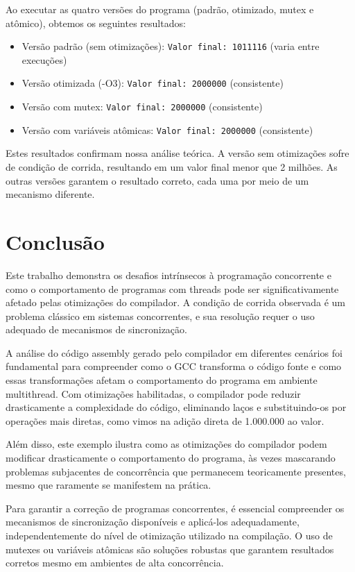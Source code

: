 \documentclass[12pt]{article}
\begin{document}
Ao executar as quatro versões do programa (padrão, otimizado, mutex e atômico), obtemos os seguintes resultados:

\begin{itemize}
    \item Versão padrão (sem otimizações): \texttt{Valor final: 1011116} (varia entre execuções)
    \item Versão otimizada (-O3): \texttt{Valor final: 2000000} (consistente)
    \item Versão com mutex: \texttt{Valor final: 2000000} (consistente)
    \item Versão com variáveis atômicas: \texttt{Valor final: 2000000} (consistente)
\end{itemize}

Estes resultados confirmam nossa análise teórica. A versão sem otimizações sofre de condição de corrida, resultando em um valor final menor que 2 milhões. As outras versões garantem o resultado correto, cada uma por meio de um mecanismo diferente.

\section{Conclusão}

Este trabalho demonstra os desafios intrínsecos à programação concorrente e como o comportamento de programas com threads pode ser significativamente afetado pelas otimizações do compilador. A condição de corrida observada é um problema clássico em sistemas concorrentes, e sua resolução requer o uso adequado de mecanismos de sincronização.

A análise do código assembly gerado pelo compilador em diferentes cenários foi fundamental para compreender como o GCC transforma o código fonte e como essas transformações afetam o comportamento do programa em ambiente multithread. Com otimizações habilitadas, o compilador pode reduzir drasticamente a complexidade do código, eliminando laços e substituindo-os por operações mais diretas, como vimos na adição direta de 1.000.000 ao valor.

Além disso, este exemplo ilustra como as otimizações do compilador podem modificar drasticamente o comportamento do programa, às vezes mascarando problemas subjacentes de concorrência que permanecem teoricamente presentes, mesmo que raramente se manifestem na prática.

Para garantir a correção de programas concorrentes, é essencial compreender os mecanismos de sincronização disponíveis e aplicá-los adequadamente, independentemente do nível de otimização utilizado na compilação. O uso de mutexes ou variáveis atômicas são soluções robustas que garantem resultados corretos mesmo em ambientes de alta concorrência.
\end{document}
